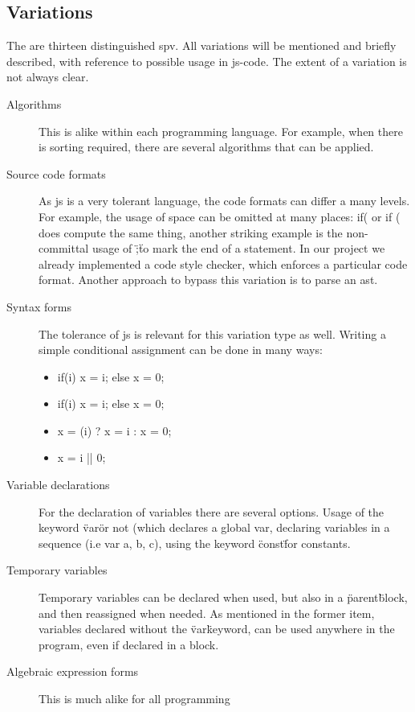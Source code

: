 \subsection{Variations} %
The are thirteen distinguished \gls{spv}. All variations will be mentioned and
briefly described, with reference to possible usage in \gls{js-code}. 
The extent of a variation is not always clear. 
\begin{description}
	\item[Algorithms] This is alike within each programming language. For example,
	when there is sorting required, there are several algorithms that can be 
	applied.
	\item[Source code formats] As \gls{js} is a very tolerant language, the
	code formats can differ a many levels. For example, the usage of space can be
	omitted at many places: if( or if ( does compute the same thing, another
	striking example is the non-committal usage of \";\" to mark the end
	of a statement. In our project we already implemented a code style checker, 
	which enforces a particular code format. Another approach to bypass this 
	variation is to parse an \gls{ast}.
	\item[Syntax forms] The tolerance of \gls{js} is relevant for this variation
	type as well. Writing a simple conditional assignment can be done in many 
	ways:
	\begin{itemize}
		\item if(i) x = i; else x = 0;
		\item if(i) { x = i;} else { x = 0;}
		\item x = (i) ? x = i : x = 0;
		\item x = i || 0;
	\end{itemize}
	\item[Variable declarations] For the declaration of variables there are 
	several options. Usage of the keyword \"var\" or not (which declares a global 
	var, declaring variables in a sequence (i.e var a, b, c), using the keyword 
	\"const\" for constants.
	\item[Temporary variables] Temporary variables can be declared when used, but
	also in a \"parent\" block, and then reassigned when needed. As mentioned in
	the former item, variables declared without the \"var\" keyword, can be used
	anywhere in the program, even if declared in a block.
	\item[Algebraic expression forms] This is much alike for all programming

\end{description}
